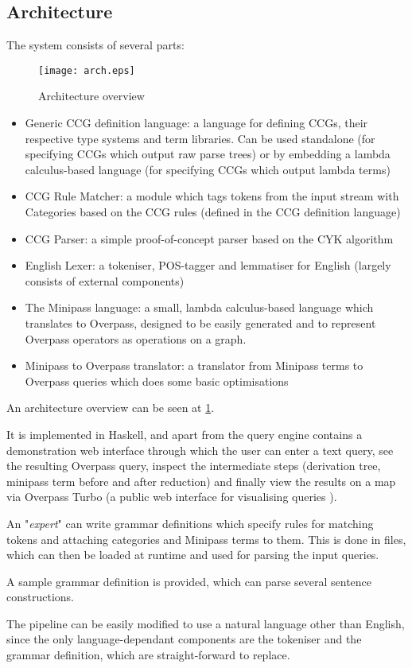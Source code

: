\documentclass[main.tex]{subfiles}
\begin{document}
\subsection{Architecture}
The system consists of several parts:

\begin{figure}[htbp!]
    \texttt{[image: arch.eps]}
    \caption{Architecture overview}
    \label{arch}
\end{figure}

\begin{itemize}
    \item Generic CCG definition language: a language for defining CCGs,
          their respective type systems and term libraries. Can be used
          standalone (for specifying CCGs which output raw parse trees)
          or by embedding a lambda calculus-based language (for specifying
          CCGs which output lambda terms)

    \item CCG Rule Matcher: a module which tags tokens from the input stream
          with Categories based on the CCG rules (defined in the CCG definition
          language)

    \item CCG Parser: a simple proof-of-concept parser based on the CYK
          algorithm

    \item English Lexer: a tokeniser, POS-tagger and lemmatiser for English
          (largely consists of external components)

    \item The Minipass language: a small, lambda calculus-based language
          which translates to Overpass, designed to be easily generated and
          to represent Overpass operators as operations on a graph.

    \item Minipass to Overpass translator: a translator from Minipass terms
          to Overpass queries which does some basic optimisations
\end{itemize}

An architecture overview can be seen at \cref{arch}.

It is implemented in Haskell, and apart from the query engine contains
a demonstration web interface through which the user can enter a text query,
see the resulting Overpass query, inspect the intermediate steps (derivation
tree, minipass term before and after reduction) and finally view the results
on a map via Overpass Turbo (a public web interface for visualising queries
\cite{overpassturbo}).

An "\emph{expert}" can write grammar definitions which specify rules for matching
tokens and attaching categories and Minipass terms to them. This is done in
 files, which can then be loaded at runtime and used for parsing the
input queries.

A sample grammar definition is provided, which can parse several sentence
constructions.

The pipeline can be easily modified to use a natural language other than
English, since the only language-dependant components are the tokeniser and
the grammar definition, which are straight-forward to replace.
\end{document}
